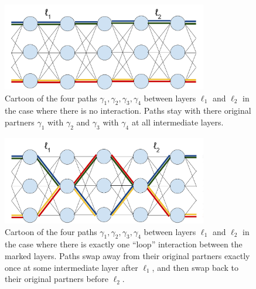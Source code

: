 \documentclass[11pt, reqno]{amsart}
\begin{document}
\begin{figure}[ht]
\centering
\includegraphics[width=0.8\textwidth]{NN_No_Loop.pdf}
\caption{Cartoon of the four paths $\gamma_1,\gamma_2,\gamma_3,\gamma_4$ between layers $\ell_1$ and $\ell_2$ in the case where there is no interaction. Paths stay with there original partners $\gamma_1$ with $\gamma_2$ and $\gamma_3$ with $\gamma_4$ at all intermediate layers.\label{fig:no-interaction}} 
\end{figure}


\begin{figure}[ht]
\centering
\includegraphics[width=0.8\textwidth]{NN_One_Loop.pdf}
\caption{Cartoon of the four paths $\gamma_1,\gamma_2,\gamma_3,\gamma_4$ between layers $\ell_1$ and $\ell_2$ in the case where there is exactly one ``loop'' interaction between the marked layers. Paths swap away from their original partners exactly once at some intermediate layer after $\ell_1$, and then swap back to their original partners before $\ell_2$.\label{fig:loop} } 
\end{figure}
\end{document}
